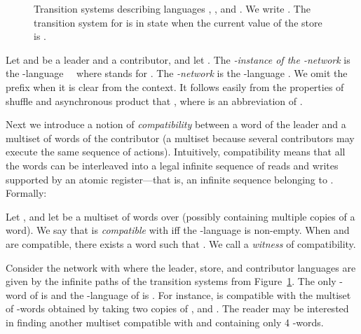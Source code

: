 \documentclass{llncs}
\begin{document}
\begin{figure}[t]
\begin{minipage}[c]{3.5cm}
\end{minipage}
\caption{Transition systems describing languages , , and .
We write .
The transition system for  is in state  when the current
value of the store is .} 
\label{fig:example}
\end{figure}
\begin{definition}\label{def:instancenetwork}
Let  and  be a leader and 
a contributor, and let . The \emph{-instance of the -network} 
is the -language \  \ where  
 stands for .
The {\em -network}  is the -language .
We omit the prefix  when it is clear from the context. 
It follows easily from the properties of shuffle and asynchronous product
that 
,
where  is an abbreviation of .
\end{definition}

Next we introduce a notion of {\em compatibility} between a word of the leader
and a multiset of words of the contributor (a multiset because 
several contributors may execute the same sequence of actions).  Intuitively, compatibility means
that all the words can be interleaved into a legal infinite sequence of reads
and writes supported by an atomic register---that is, an infinite sequence
belonging to . Formally:

\begin{definition}\label{def:CompRealReachpb}
Let , and let  be a multiset of words
over  (possibly containing multiple copies of a word).
We say that  is {\em compatible} with  if{}f the -language  is non-empty.
When  and  are compatible, there exists a word  such that .
We call  a \emph{witness} of compatibility.
\end{definition}

\begin{example}
Consider the network with  where the leader, store, and
contributor languages are given by the infinite paths of the
transition systems from Figure~\ref{fig:example}. The only
-word of  is  and the
-language of  is
. For
instance,  is compatible with the
multiset  of  -words obtained by taking two copies 
of ,  and .
The reader may be interested in finding another multiset compatible with  and containing
only 4 -words.
\end{example}
\end{document}
